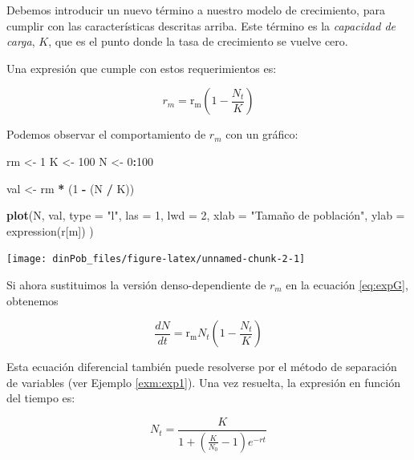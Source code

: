 \documentclass[12pt,letterpaper,]{book}
\newenvironment{Shaded}{\begin{snugshade}}{\end{snugshade}}
\newcommand{\KeywordTok}[1]{\textcolor[rgb]{0.13,0.29,0.53}{\textbf{#1}}}
\newcommand{\DataTypeTok}[1]{\textcolor[rgb]{0.13,0.29,0.53}{#1}}
\newcommand{\DecValTok}[1]{\textcolor[rgb]{0.00,0.00,0.81}{#1}}
\newcommand{\StringTok}[1]{\textcolor[rgb]{0.31,0.60,0.02}{#1}}
\newcommand{\OperatorTok}[1]{\textcolor[rgb]{0.81,0.36,0.00}{\textbf{#1}}}
\newcommand{\NormalTok}[1]{#1}
\begin{document}
Debemos introducir un nuevo término a nuestro modelo de crecimiento,
para cumplir con las características descritas arriba. Este término es
la \emph{capacidad de carga}, \(K\), que es el punto donde la tasa de
crecimiento se vuelve cero.

Una expresión que cumple con estos requerimientos es:

\[
 r_m = \mathrm{r_m}\left(1-\frac{N_t}{K}\right)
\]

Podemos observar el comportamiento de \(r_m\) con un gráfico:

\begin{Shaded}
\begin{Highlighting}[]
\NormalTok{rm <-}\StringTok{ }\DecValTok{1}
\NormalTok{K <-}\StringTok{ }\DecValTok{100}
\NormalTok{N <-}\StringTok{ }\DecValTok{0}\OperatorTok{:}\DecValTok{100}

\NormalTok{val <-}\StringTok{ }\NormalTok{rm }\OperatorTok{*}\StringTok{ }\NormalTok{(}\DecValTok{1} \OperatorTok{-}\StringTok{ }\NormalTok{(N }\OperatorTok{/}\StringTok{ }\NormalTok{K))}

\KeywordTok{plot}\NormalTok{(N,}
\NormalTok{  val,}
  \DataTypeTok{type =} \StringTok{"l"}\NormalTok{, }\DataTypeTok{las =} \DecValTok{1}\NormalTok{, }\DataTypeTok{lwd =} \DecValTok{2}\NormalTok{,}
  \DataTypeTok{xlab =} \StringTok{"Tamaño de población",}
\StringTok{  ylab = expression(r[m])}
\StringTok{  )}
\end{Highlighting}
\end{Shaded}

\begin{center}\texttt{[image: dinPob\_files/figure-latex/unnamed-chunk-2-1]} \end{center}

Si ahora sustituimos la versión denso-dependiente de \(r_m\) en la
ecuación \eqref{eq:expG}, obtenemos

\begin{equation}
\frac{dN}{dt}=\mathrm{r_m} N_t \left(1-\frac{N_t}{K}\right)
 \label{eq:logi1}
\end{equation}

Esta ecuación diferencial también puede resolverse por el método de
separación de variables (ver Ejemplo \ref{exm:exp1}). Una vez resuelta,
la expresión en función del tiempo es:

\begin{equation}
N_t= \frac{K}{1+\left(\frac{K}{N_0}-1\right)e^{-rt}}
 \label{eq:logi2}
\end{equation}
\end{document}
